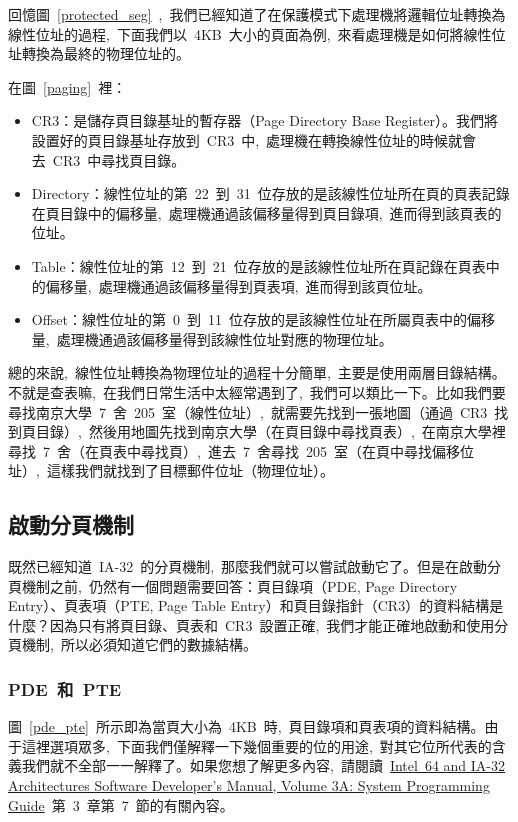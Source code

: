 回憶圖~\ref{protected_seg}~,~我們已經知道了在保護模式下處理機將邏輯位址轉換為線性位址的過程,~下面我們以~4KB~大小的頁面為例,~來看處理機是如何將線性位址轉換為最終的物理位址的。


在圖~\ref{paging}~裡：
\begin{itemize}
\item CR3：是儲存頁目錄基址的暫存器（Page Directory Base Register）。我們將設置好的頁目錄基址存放到~CR3~中,~處理機在轉換線性位址的時候就會去~CR3~中尋找頁目錄。
\item Directory：線性位址的第~22~到~31~位存放的是該線性位址所在頁的頁表記錄在頁目錄中的偏移量,~處理機通過該偏移量得到頁目錄項,~進而得到該頁表的位址。
\item Table：線性位址的第~12~到~21~位存放的是該線性位址所在頁記錄在頁表中的偏移量,~處理機通過該偏移量得到頁表項,~進而得到該頁位址。
\item Offset：線性位址的第~0~到~11~位存放的是該線性位址在所屬頁表中的偏移量,~處理機通過該偏移量得到該線性位址對應的物理位址。
\end{itemize}

總的來說,~線性位址轉換為物理位址的過程十分簡單,~主要是使用兩層目錄結構。不就是查表嘛,~在我們日常生活中太經常遇到了,~我們可以類比一下。比如我們要尋找南京大學~7~舍~205~室（線性位址）,~就需要先找到一張地圖（通過~CR3~找到頁目錄）,~然後用地圖先找到南京大學（在頁目錄中尋找頁表）,~在南京大學裡尋找~7~舍（在頁表中尋找頁）,~進去~7~舍尋找~205~室（在頁中尋找偏移位址）,~這樣我們就找到了目標郵件位址（物理位址）。


\subsection{啟動分頁機制}

既然已經知道~IA-32~的分頁機制,~那麼我們就可以嘗試啟動它了。但是在啟動分頁機制之前,~仍然有一個問題需要回答：頁目錄項（PDE, Page Directory Entry）、頁表項（PTE, Page Table Entry）和頁目錄指針（CR3）的資料結構是什麼？因為只有將頁目錄、頁表和~CR3~設置正確,~我們才能正確地啟動和使用分頁機制,~所以必須知道它們的數據結構。

\subsubsection{PDE~和~PTE}

圖~\ref{pde_pte}~所示即為當頁大小為~4KB~時,~頁目錄項和頁表項的資料結構。由于這裡選項眾多,~下面我們僅解釋一下幾個重要的位的用途,~對其它位所代表的含義我們就不全部一一解釋了。如果您想了解更多內容,~請閱讀~\href{http://download.intel.com/design/processor/manuals/253668.pdf}{Intel\textregistered~64 and IA-32 Architectures Software Developer's Manual, Volume 3A: System Programming Guide}~第~3~章第~7~節的有關內容。

